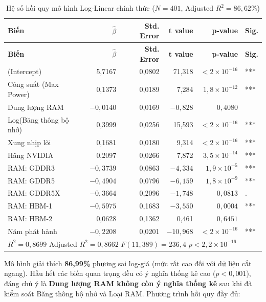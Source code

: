 \setlength\LTleft{\fill}
\setlength\LTright{\fill}
\begin{longtable}{|l|r|r|r|r|l|}
\caption{Hệ số hồi quy mô hình Log-Linear chính thức ($N = 401$, Adjusted $R^2 = 86{,}62\%$)}
\label{tab:log_coef} \\
\hline
\textbf{Biến} & \textbf{$\hat{\beta}$} & \textbf{Std. Error} & \textbf{t value} & \textbf{p-value} & \textbf{Sig.} \\
\hline
\endfirsthead
\hline
\textbf{Biến} & \textbf{$\hat{\beta}$} & \textbf{Std. Error} & \textbf{t value} & \textbf{p-value} & \textbf{Sig.} \\
\hline
\endhead
\hline
\endlastfoot
(Intercept) & 5,7167 & 0,0802 & 71,318 & $< 2 \times 10^{-16}$ & *** \\
Công suất (Max Power) & 0,1373 & 0,0189 & 7,284 & $1{,}8 \times 10^{-12}$ & *** \\
Dung lượng RAM & $-0{,}0140$ & 0,0169 & $-0{,}828$ & $0{,}4080$ & \\
Log(Băng thông bộ nhớ) & 0,3999 & 0,0256 & 15,593 & $< 2 \times 10^{-16}$ & *** \\
Xung nhịp lõi & 0,1681 & 0,0180 & 9,314 & $< 2 \times 10^{-16}$ & *** \\
Hãng NVIDIA & 0,2097 & 0,0266 & 7,872 & $3{,}5 \times 10^{-14}$ & *** \\
RAM: GDDR3 & $-0{,}3739$ & 0,0863 & $-4{,}334$ & $1{,}9 \times 10^{-5}$ & *** \\
RAM: GDDR5 & $-0{,}4904$ & 0,0796 & $-6{,}159$ & $1{,}8 \times 10^{-9}$ & *** \\
RAM: GDDR5X & $-0{,}3664$ & 0,2096 & $-1{,}748$ & $0{,}0813$ & . \\
RAM: HBM-1 & $-0{,}5975$ & 0,1683 & $-3{,}550$ & $0{,}0004$ & *** \\
RAM: HBM-2 & 0,0628 & 0,1362 & 0,461 & $0{,}6451$ & \\
Năm phát hành & $-0{,}2208$ & 0,0201 & $-10{,}968$ & $< 2 \times 10^{-16}$ & *** \\
\hline
\multicolumn{6}{|l|}{$R^2 = 0{,}8699$ \quad Adjusted $R^2 = 0{,}8662$ \quad $F(11, 389) = 236{,}4$ \quad $p < 2{,}2 \times 10^{-16}$} \\
\hline
\end{longtable}

Mô hình giải thích \textbf{86,99\%} phương sai log-giá (mức rất cao đối với dữ liệu cắt ngang). Hầu hết các biến quan trọng đều có ý nghĩa thống kê cao ($p < 0{,}001$), đáng chú ý là \textbf{Dung lượng RAM không còn ý nghĩa thống kê} sau khi đã kiểm soát Băng thông bộ nhớ và Loại RAM. Phương trình hồi quy đầy đủ:

